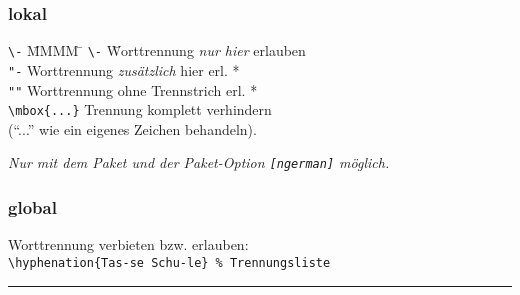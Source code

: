 \pagebreak
{}
\setlength{\columnseprule}{0.5pt}












\columnbreak
{} \label{sec:trennung}
\subsubsection{lokal}
%
\begin{tabbing}
	\lstinline|\-| \= MMMM \= \kill
\lstinline|\-|	\hspace{1ex} \= Worttrennung \emph{nur hier} erlauben \\
\lstinline|"-|	\> Worttrennung \emph{zusätzlich} hier erl. * \\
\lstinline|""|	\> Worttrennung ohne Trennstrich erl. * \\
\lstinline|\mbox{...}| \> \> Trennung komplett verhindern \\ 
 ("`..."' wie ein eigenes Zeichen behandeln).
\end{tabbing}
{\footnotesize\slshape * Nur mit dem Paket  und der Paket-Option \lstinline|[ngerman]| möglich.}
%
\subsubsection{global}
Worttrennung verbieten bzw. erlauben:\\
\lstinline|\hyphenation{Tas-se Schu-le} % Trennungsliste|

\hrule \vspace{0.5\baselineskip}
